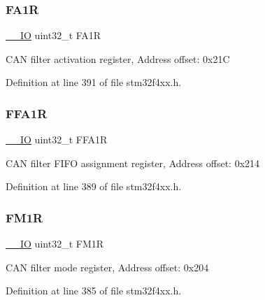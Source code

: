 \subsubsection{\texorpdfstring{F\+A1R}{FA1R}}
{\footnotesize\ttfamily \hyperlink{group___c_m_s_i_s__core__definitions_gaec43007d9998a0a0e01faede4133d6be}{\+\_\+\+\_\+\+IO} uint32\+\_\+t F\+A1R}

C\+AN filter activation register, Address offset\+: 0x21C 

Definition at line 391 of file stm32f4xx.\+h.

\mbox{\label{struct_c_a_n___type_def_af1405e594e39e5b34f9499f680157a25}} 
\subsubsection{\texorpdfstring{F\+F\+A1R}{FFA1R}}
{\footnotesize\ttfamily \hyperlink{group___c_m_s_i_s__core__definitions_gaec43007d9998a0a0e01faede4133d6be}{\+\_\+\+\_\+\+IO} uint32\+\_\+t F\+F\+A1R}

C\+AN filter F\+I\+FO assignment register, Address offset\+: 0x214 

Definition at line 389 of file stm32f4xx.\+h.

\mbox{\label{struct_c_a_n___type_def_aaa6f4cf1f16aaa6d17ec6c410db76acf}} 
\subsubsection{\texorpdfstring{F\+M1R}{FM1R}}
{\footnotesize\ttfamily \hyperlink{group___c_m_s_i_s__core__definitions_gaec43007d9998a0a0e01faede4133d6be}{\+\_\+\+\_\+\+IO} uint32\+\_\+t F\+M1R}

C\+AN filter mode register, Address offset\+: 0x204 

Definition at line 385 of file stm32f4xx.\+h.

\mbox{\label{struct_c_a_n___type_def_a1cb734df34f6520a7204c4c70634ebba}} 
